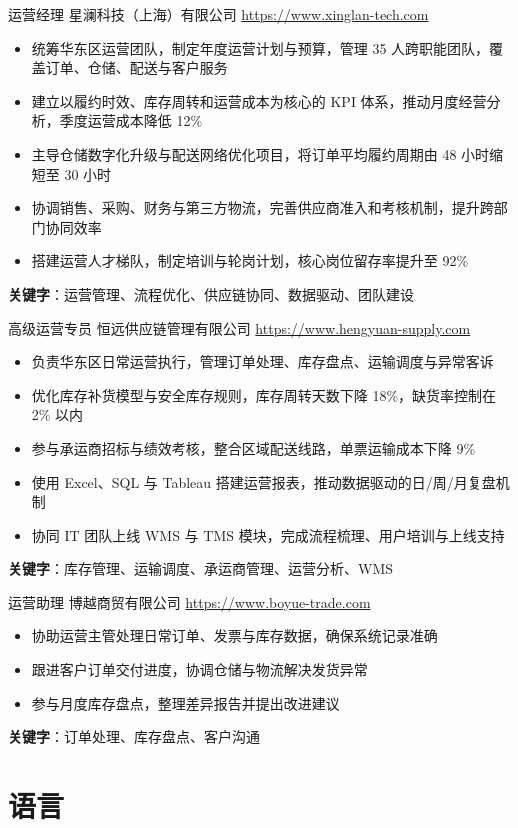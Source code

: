 \documentclass[a4paper, serif, 10pt]{moderncv}
\begin{document}
        {运营经理}
        {星澜科技（上海）有限公司}
        {\url{https://www.xinglan-tech.com}}
        {}
        {\begin{itemize}
\item 统筹华东区运营团队，制定年度运营计划与预算，管理 35 人跨职能团队，覆盖订单、仓储、配送与客户服务
\item 建立以履约时效、库存周转和运营成本为核心的 KPI 体系，推动月度经营分析，季度运营成本降低 12\%
\item 主导仓储数字化升级与配送网络优化项目，将订单平均履约周期由 48 小时缩短至 30 小时
\item 协调销售、采购、财务与第三方物流，完善供应商准入和考核机制，提升跨部门协同效率
\item 搭建运营人才梯队，制定培训与轮岗计划，核心岗位留存率提升至 92\%
\end{itemize}
\textbf{关键字}：运营管理、流程优化、供应链协同、数据驱动、团队建设}

        {高级运营专员}
        {恒远供应链管理有限公司}
        {\url{https://www.hengyuan-supply.com}}
        {}
        {\begin{itemize}
\item 负责华东区日常运营执行，管理订单处理、库存盘点、运输调度与异常客诉
\item 优化库存补货模型与安全库存规则，库存周转天数下降 18\%，缺货率控制在 2\% 以内
\item 参与承运商招标与绩效考核，整合区域配送线路，单票运输成本下降 9\%
\item 使用 Excel、SQL 与 Tableau 搭建运营报表，推动数据驱动的日/周/月复盘机制
\item 协同 IT 团队上线 WMS 与 TMS 模块，完成流程梳理、用户培训与上线支持
\end{itemize}
\textbf{关键字}：库存管理、运输调度、承运商管理、运营分析、WMS}

        {运营助理}
        {博越商贸有限公司}
        {\url{https://www.boyue-trade.com}}
        {}
        {\begin{itemize}
\item 协助运营主管处理日常订单、发票与库存数据，确保系统记录准确
\item 跟进客户订单交付进度，协调仓储与物流解决发货异常
\item 参与月度库存盘点，整理差异报告并提出改进建议
\end{itemize}
\textbf{关键字}：订单处理、库存盘点、客户沟通}
\section{语言}
\end{document}
